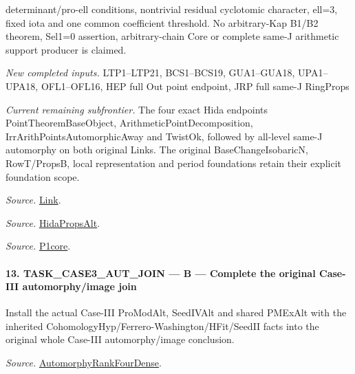 \documentclass[11pt,a4paper]{article}
\numberwithin{equation}{section}
\theoremstyle{remark}\newtheorem{remark}[theorem]{Remark}
\begin{document}
determinant/pro-ell conditions, nontrivial residual cyclotomic character, ell=3, fixed iota and one common coefficient threshold. No arbitrary-Kap B1/B2 theorem, Sel1=0 assertion, arbitrary-chain Core or complete same-J arithmetic support producer is claimed.

\emph{New completed inputs.} LTP1–LTP21, BCS1–BCS19, GUA1–GUA18, UPA1–UPA18, OFL1–OFL16, HEP full Out point endpoint, JRP full same-J RingProps

\emph{Current remaining subfrontier.} The four exact Hida endpoints PointTheoremBaseObject, ArithmeticPointDecomposition, IrrArithPointsAutomorphicAway and TwistOk, followed by all-level same-J automorphy on both original Links. The original BaseChangeIsobaricN, RowT/PropsB, local representation and period foundations retain their explicit foundation scope.

\emph{Source.} \href{https://github.com/CocoSgt/riemann-hypothesis-lean/blob/7cbf7a0c32fca1badf05931879a37c3f8a2b03b4/src/Development/AutomorphicArithmetic/AutomorphicVarieties/WeakShimuraTheory/IsAlgClosureField.lean#L19-L52}{Link}.

\emph{Source.} \href{https://github.com/CocoSgt/riemann-hypothesis-lean/blob/7cbf7a0c32fca1badf05931879a37c3f8a2b03b4/src/Development/AutomorphicArithmetic/AutomorphicVarieties/ModularityArgument/ThresholdArguments/DenseThresholdCases/PointTheoremBaseObject.lean#L32-L38}{HidaPropsAlt}.

\emph{Source.} \href{https://github.com/CocoSgt/riemann-hypothesis-lean/blob/7cbf7a0c32fca1badf05931879a37c3f8a2b03b4/src/Development/AutomorphicArithmetic/AutomorphicVarieties/WeilGroupCharacters/UniversalOrdinaryDeterminantRing.lean#L284-L286}{P1core}.



\paragraph{13. TASK\_\allowbreak CASE3\_\allowbreak AUT\_\allowbreak JOIN — B — Complete the original Case-III automorphy/image join}

Install the actual Case-III ProModAlt, SeedIVAlt and shared PMExAlt with the inherited CohomologyHyp/Ferrero-Washington/HFit/SeedII facts into the original whole Case-III automorphy/image conclusion.

\emph{Source.} \href{https://github.com/CocoSgt/riemann-hypothesis-lean/blob/7cbf7a0c32fca1badf05931879a37c3f8a2b03b4/src/Development/AutomorphicArithmetic/AutomorphicVarieties/ModularityArgument/ThresholdArguments/DenseThresholdCases/PromodularityCaseThree.lean#L43-L44}{AutomorphyRankFourDense}.
\end{document}
